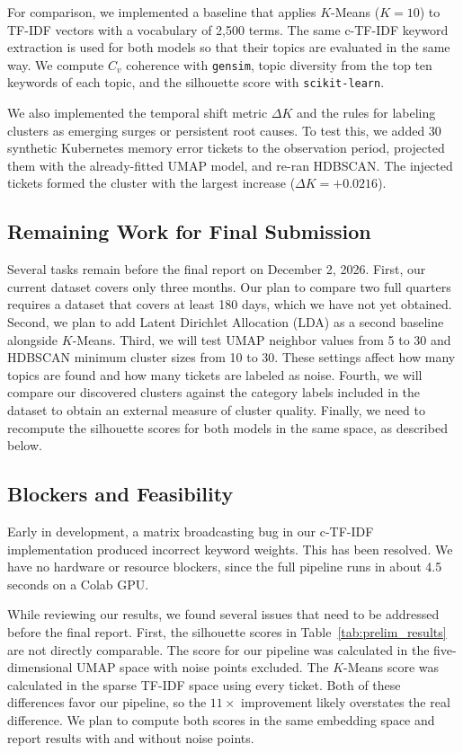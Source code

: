 \documentclass[11pt]{article}
\begin{document}
For comparison, we implemented a baseline that applies $K$-Means ($K = 10$) to TF-IDF vectors with a vocabulary of 2,500 terms. The same c-TF-IDF keyword extraction is used for both models so that their topics are evaluated in the same way. We compute $C_v$ coherence with \texttt{gensim}, topic diversity from the top ten keywords of each topic, and the silhouette score with \texttt{scikit-learn}.

We also implemented the temporal shift metric $\Delta K$ and the rules for labeling clusters as emerging surges or persistent root causes. To test this, we added 30 synthetic Kubernetes memory error tickets to the observation period, projected them with the already-fitted UMAP model, and re-ran HDBSCAN. The injected tickets formed the cluster with the largest increase ($\Delta K = +0.0216$).

\subsection{Remaining Work for Final Submission}
Several tasks remain before the final report on December 2, 2026. First, our current dataset covers only three months. Our plan to compare two full quarters requires a dataset that covers at least 180 days, which we have not yet obtained. Second, we plan to add Latent Dirichlet Allocation (LDA) as a second baseline alongside $K$-Means. Third, we will test UMAP neighbor values from 5 to 30 and HDBSCAN minimum cluster sizes from 10 to 30. These settings affect how many topics are found and how many tickets are labeled as noise. Fourth, we will compare our discovered clusters against the category labels included in the dataset to obtain an external measure of cluster quality. Finally, we need to recompute the silhouette scores for both models in the same space, as described below.

\subsection{Blockers and Feasibility}
Early in development, a matrix broadcasting bug in our c-TF-IDF implementation produced incorrect keyword weights. This has been resolved. We have no hardware or resource blockers, since the full pipeline runs in about 4.5 seconds on a Colab GPU.

While reviewing our results, we found several issues that need to be addressed before the final report. First, the silhouette scores in Table~\ref{tab:prelim_results} are not directly comparable. The score for our pipeline was calculated in the five-dimensional UMAP space with noise points excluded. The $K$-Means score was calculated in the sparse TF-IDF space using every ticket. Both of these differences favor our pipeline, so the $11\times$ improvement likely overstates the real difference. We plan to compute both scores in the same embedding space and report results with and without noise points.
\end{document}
